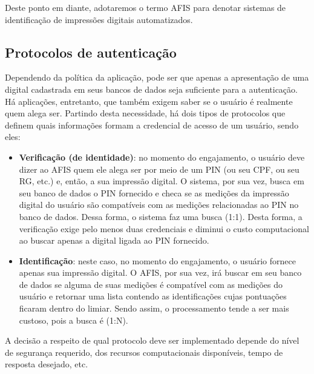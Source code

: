 %

Deste ponto em diante, adotaremos o termo \acrfull{AFIS} para denotar sistemas de identificação de impressões digitais automatizados.

\subsection{Protocolos de autenticação}
Dependendo da política da aplicação, pode ser que apenas a apresentação de uma digital cadastrada em seus bancos de dados seja suficiente para a autenticação. Há aplicações, entretanto, que também exigem saber se o usuário é realmente quem alega ser. Partindo desta necessidade, há dois tipos de protocolos que definem quais informações formam a credencial de acesso de um usuário, sendo eles:

\begin{itemize}
	\item \textbf{Verificação (de identidade)}: no momento do engajamento, o usuário deve dizer ao \acrshort{AFIS} quem ele alega ser por meio de um PIN (ou seu CPF, ou seu RG, etc.) e, então, a sua impressão digital. O sistema, por sua vez, busca em seu banco de dados o PIN fornecido e checa se as medições da impressão digital do usuário são compatíveis com as medições relacionadas ao PIN no banco de dados. Dessa forma, o sistema faz uma busca (1:1). Desta forma, a verificação exige pelo menos duas credenciais e diminui o custo computacional ao buscar apenas a digital ligada ao PIN fornecido.
	\item \textbf{Identificação}: neste caso, no momento do engajamento, o usuário fornece apenas sua impressão digital. O \acrshort{AFIS}, por sua vez, irá buscar em seu banco de dados se alguma de suas medições é compatível com as medições do usuário e retornar uma lista contendo as identificações cujas pontuações ficaram dentro do limiar. Sendo assim, o processamento tende a ser mais custoso, pois a busca é (1:N).
\end{itemize}

A decisão a respeito de qual protocolo deve ser implementado depende do nível de segurança requerido, dos recursos computacionais disponíveis, tempo de resposta desejado, etc.


